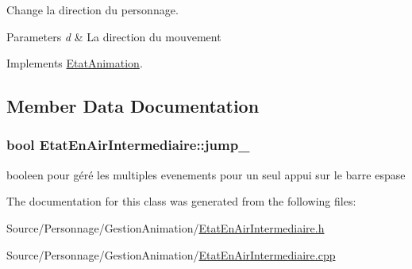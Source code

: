 Change la direction du personnage. 


\begin{DoxyParams}{Parameters}
{\em d} & La direction du mouvement \\
\hline
\end{DoxyParams}


Implements \hyperlink{classEtatAnimation_a09e0277b2679249f33e6b95047cb9378}{Etat\-Animation}.



\subsection{Member Data Documentation}
\hypertarget{classEtatEnAirIntermediaire_afdba4ed744f4f08ef0079bcbcd48ca08}{
\subsubsection[{jump\-\_\-}]{\setlength{\rightskip}{0pt plus 5cm}bool Etat\-En\-Air\-Intermediaire\-::jump\-\_\-\hspace{0.3cm}{\ttfamily [private]}}}\label{classEtatEnAirIntermediaire_afdba4ed744f4f08ef0079bcbcd48ca08}
booleen pour géré les multiples evenements pour un seul appui sur le barre espase 

The documentation for this class was generated from the following files\-:\begin{DoxyCompactItemize}
\item 
Source/\-Personnage/\-Gestion\-Animation/\hyperlink{EtatEnAirIntermediaire_8h}{Etat\-En\-Air\-Intermediaire.\-h}\item 
Source/\-Personnage/\-Gestion\-Animation/\hyperlink{EtatEnAirIntermediaire_8cpp}{Etat\-En\-Air\-Intermediaire.\-cpp}\end{DoxyCompactItemize}
